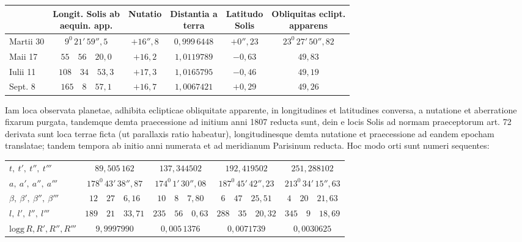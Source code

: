 \begin{center}
\begingroup\fontsize{9}{11}\selectfont\setlength{\tabcolsep}{2pt}
\begin{tabular}{|l|c|c|c|c|c|}
\hline
& \shortstack{Longit. Solis ab\\aequin. app.} & Nutatio & \shortstack{Distantia a\\terra} & \shortstack{Latitudo\\Solis} & \shortstack{Obliquitas eclipt.\\apparens}\\\hline
Martii 30 & $9^0\,21'\,59''{,}5$ & $+16''{,}8$ & $0{,}999\,6448$ & $+0''{,}23$ & $23^0\,27'\,50''{,}82$\\
Maii 17 & $55\quad56\quad20{,}0$ & $+16{,}2$ & $1{,}0119789$ & $-0{,}63$ & $49{,}83$\\
Iulii 11 & $108\quad34\quad53{,}3$ & $+17{,}3$ & $1{,}0165795$ & $-0{,}46$ & $49{,}19$\\
Sept. 8 & $165\quad8\quad57{,}1$ & $+16{,}7$ & $1{,}0067421$ & $+0{,}29$ & $49{,}26$\\\hline
\end{tabular}\endgroup
\end{center}

Iam loca observata planetae, adhibita eclipticae obliquitate apparente, in longitudines et latitudines conversa, a nutatione et aberratione fixarum purgata, tandemque demta praecessione ad initium anni 1807 reducta sunt, dein e locis Solis ad normam praeceptorum art. 72 derivata sunt loca terrae ficta (ut parallaxis ratio habeatur), longitudinesque demta nutatione et praecessione ad eandem epocham translatae; tandem tempora ab initio anni numerata et ad meridianum Parisinum reducta. Hoc modo orti sunt numeri sequentes:
\begin{center}
\begingroup\fontsize{9}{11}\selectfont\setlength{\tabcolsep}{2.5pt}
\begin{tabular}{l|c|c|c|c}
$t,\ t',\ t'',\ t'''$ & $89{,}505\,162$ & $137{,}344502$ & $192{,}419502$ & $251{,}288102$\\
$a,\ a',\ a'',\ a'''$ & $178^0\,43'\,38''{,}87$ & $174^0\,1'\,30''{,}08$ & $187^0\,45'\,42''{,}23$ & $213^0\,34'\,15''{,}63$\\
$\beta,\ \beta',\ \beta'',\ \beta'''$ & $12\quad27\quad6{,}16$ & $10\quad8\quad7{,}80$ & $6\quad47\quad25{,}51$ & $4\quad20\quad21{,}63$\\
$l,\ l',\ l'',\ l'''$ & $189\quad21\quad33{,}71$ & $235\quad56\quad0{,}63$ & $288\quad35\quad20{,}32$ & $345\quad9\quad18{,}69$\\
$\mathrm{logg}\,R,R',R'',R'''$ & $9{,}9997990$ & $0{,}005\,1376$ & $0{,}0071739$ & $0{,}0030625$
\end{tabular}\endgroup
\end{center}

